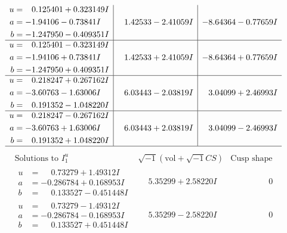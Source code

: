 \documentclass[1p]{elsarticle_modified}
\theoremstyle{definition}
\newcommand{\I}{\sqrt{-1}}
\begin{document}
$$\begin{array}{c|c|c}
\begin{aligned}
u &= \phantom{-}0.125401 + 0.323149 I \\
a &= -1.94106 - 0.73841 I \\
b &= -1.247950 - 0.409351 I\end{aligned}
 & \phantom{-}1.42533 - 2.41059 I & -8.64364 - 0.77659 I \\ \hline\begin{aligned}
u &= \phantom{-}0.125401 - 0.323149 I \\
a &= -1.94106 + 0.73841 I \\
b &= -1.247950 + 0.409351 I\end{aligned}
 & \phantom{-}1.42533 + 2.41059 I & -8.64364 + 0.77659 I \\ \hline\begin{aligned}
u &= \phantom{-}0.218247 + 0.267162 I \\
a &= -3.60763 - 1.63006 I \\
b &= \phantom{-}0.191352 - 1.048220 I\end{aligned}
 & \phantom{-}6.03443 - 2.03819 I & \phantom{-}3.04099 + 2.46993 I \\ \hline\begin{aligned}
u &= \phantom{-}0.218247 - 0.267162 I \\
a &= -3.60763 + 1.63006 I \\
b &= \phantom{-}0.191352 + 1.048220 I\end{aligned}
 & \phantom{-}6.03443 + 2.03819 I & \phantom{-}3.04099 - 2.46993 I\\
 \hline 
 \end{array}$$\newpage$$\begin{array}{c|c|c}  
\text{Solutions to }I^u_{1}& \I (\text{vol} + \sqrt{-1}CS) & \text{Cusp shape}\\
 \hline 
\begin{aligned}
u &= \phantom{-}0.73279 + 1.49312 I \\
a &= -0.286784 + 0.168953 I \\
b &= \phantom{-}0.133527 - 0.451448 I\end{aligned}
 & \phantom{-}5.35299 + 2.58220 I & \phantom{-0.000000 } 0 \\ \hline\begin{aligned}
u &= \phantom{-}0.73279 - 1.49312 I \\
a &= -0.286784 - 0.168953 I \\
b &= \phantom{-}0.133527 + 0.451448 I\end{aligned}
 & \phantom{-}5.35299 - 2.58220 I & \phantom{-0.000000 } 0 \\ \hline\begin{aligned}

\end{aligned}
\end{array}$$
\end{document}

